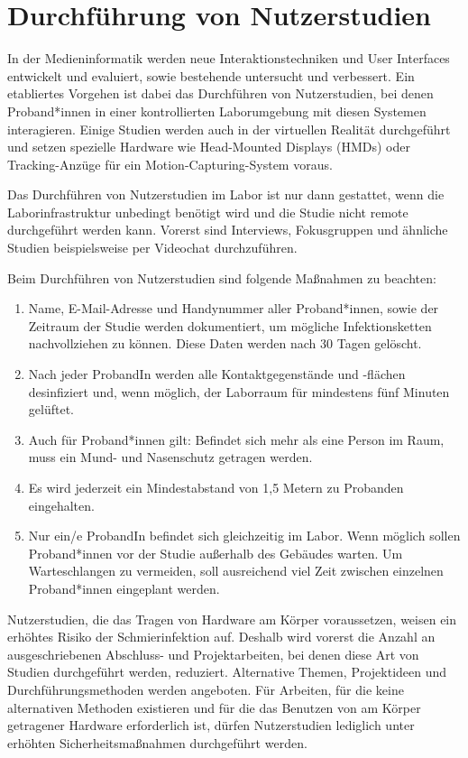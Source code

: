\section{Durchführung von Nutzerstudien}\label{sec:nutzerstudien}

\noindent
In der Medieninformatik werden neue Interaktionstechniken und User Interfaces entwickelt und evaluiert, sowie bestehende untersucht und verbessert. Ein etabliertes Vorgehen ist dabei das Durchführen von Nutzerstudien, bei denen Proband*innen in einer kontrollierten Laborumgebung mit diesen Systemen interagieren. Einige Studien werden auch in der virtuellen Realität durchgeführt und setzen spezielle Hardware wie Head-Mounted Displays (HMDs) oder Tracking-Anzüge für ein Motion-Capturing-System voraus.

\medskip
\noindent
Das Durchführen von Nutzerstudien im Labor ist nur dann gestattet, wenn die Laborinfrastruktur unbedingt benötigt wird und die Studie nicht remote durchgeführt werden kann. Vorerst sind Interviews, Fokusgruppen und ähnliche Studien beispielsweise per Videochat durchzuführen.

\noindent
Beim Durchführen von Nutzerstudien sind folgende Maßnahmen zu beachten:

\begin{enumerate}
    \item Name, E-Mail-Adresse und Handynummer aller Proband*innen, sowie der Zeitraum der Studie werden dokumentiert, um mögliche Infektionsketten nachvollziehen zu können. Diese Daten werden nach 30 Tagen gelöscht.
    \item Nach jeder ProbandIn werden alle Kontaktgegenstände und -flächen desinfiziert und, wenn möglich, der Laborraum für mindestens fünf Minuten gelüftet.
    \item Auch für Proband*innen gilt: Befindet sich mehr als eine Person im Raum, muss ein Mund- und Nasenschutz getragen werden.
    \item Es wird jederzeit ein Mindestabstand von 1,5 Metern zu Probanden eingehalten.
    \item Nur ein/e ProbandIn befindet sich gleichzeitig im Labor. Wenn möglich sollen Proband*innen vor der Studie außerhalb des Gebäudes warten. Um Warteschlangen zu vermeiden, soll ausreichend viel Zeit zwischen einzelnen Proband*innen eingeplant werden.
\end{enumerate}

\noindent
Nutzerstudien, die das Tragen von Hardware am Körper voraussetzen, weisen ein erhöhtes Risiko der Schmierinfektion auf.
Deshalb wird vorerst die Anzahl an ausgeschriebenen Abschluss- und Projektarbeiten, bei denen diese Art von Studien durchgeführt werden, reduziert. Alternative Themen, Projektideen und Durchführungsmethoden werden angeboten. Für Arbeiten, für die keine alternativen Methoden existieren und für die das Benutzen von am Körper getragener Hardware erforderlich ist, dürfen Nutzerstudien lediglich unter erhöhten Sicherheitsmaßnahmen durchgeführt werden.

